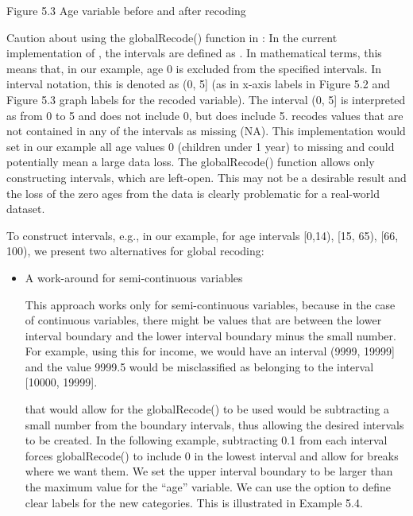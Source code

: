\documentclass[letterpaper,10pt,english]{sphinxmanual}
\begin{document}
\begin{DUlineblock}{0em}
\item[] \sphinxcode{\sphinxupquote{\#\#    (0,5{]}   (5,11{]}  (11,17{]}  (17,21{]}  (21,25{]}  (25,49{]}  (49,65{]} (65,100{]}}}
\item[] 
\end{DUlineblock}

\noindent{}

Figure 5.3 Age variable before and after recoding

Caution about using the globalRecode() function in : In the
current implementation of , the intervals are defined as
. In mathematical terms, this means that, in our example,
age 0 is excluded from the specified intervals. In interval notation,
this is denoted as (0, 5{]} (as in x-axis labels in Figure 5.2 and Figure
5.3 graph labels for the recoded variable). The interval (0, 5{]} is
interpreted as from 0 to 5 and does not include 0, but does include 5.
 recodes values that are not contained in any of the intervals as
missing (NA). This implementation would set in our example all age
values 0 (children under 1 year) to missing and could potentially mean a
large data loss. The globalRecode() function allows only constructing
intervals, which are left-open. This may not be a desirable result and
the loss of the zero ages from the data is clearly problematic for a
real-world dataset.

To construct  intervals, e.g., in our example, for age
intervals {[}0,14), {[}15, 65), {[}66, 100), we present two alternatives for
global recoding:
\begin{itemize}
\item {} 
A work-around for semi-continuous variables %
\begin{footnote}[3]\sphinxAtStartFootnote
This approach works only for semi-continuous variables, because in
the case of continuous variables, there might be values that are
between the lower interval boundary and the lower interval boundary
minus the small number. For example, using this for income, we would
have an interval (9999, 19999{]} and the value 9999.5 would be
misclassified as belonging to the interval {[}10000, 19999{]}.
%
\end{footnote}
that would allow for the globalRecode() to be used would be
subtracting a small number from the boundary intervals, thus allowing
the desired intervals to be created. In the following example,
subtracting 0.1 from each interval forces globalRecode() to include 0
in the lowest interval and allow for breaks where we want them. We
set the upper interval boundary to be larger than the maximum value
for the “age” variable. We can use the option  to define
clear labels for the new categories. This is illustrated in Example
5.4.

\end{itemize}
\end{document}
